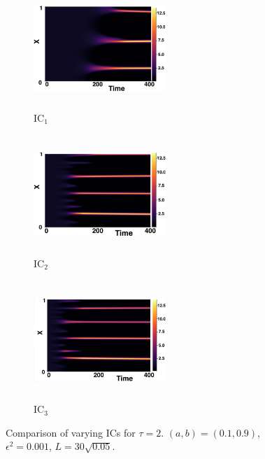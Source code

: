 \begin{figure}[H]
    \centering
    \begin{subfigure}[b]{0.32\textwidth}
        \centering
        \includegraphics[width=5cm,height=4.5cm]{gaff2.png}
        \caption{$\text{IC}_1$}
        \label{}
    \end{subfigure}
    \hfill
    \begin{subfigure}[b]{0.32\textwidth}
        \centering
        \includegraphics[width=5cm,height=4.5cm]{ic22.png}
        \caption{$\text{IC}_2$}
        \label{}
    \end{subfigure}
    \hfill
    \begin{subfigure}[b]{0.32\textwidth}
        \centering
        \includegraphics[width=5cm,height=4.5cm]{ic32.png}
        \caption{$\text{IC}_3$}
        \label{}
    \end{subfigure}
    \caption{Comparison of varying ICs for $\tau=2$. $(a,b)=(0.1,0.9)$, $\epsilon^2=0.001$, $L=30\sqrt{0.05}$.}
    \label{fig:figtau2}
\end{figure}
